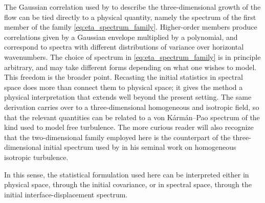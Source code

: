 The Gaussian correlation used by \citet{frame-towne-2024} to describe the three-dimensional growth of the flow can be tied directly to a physical quantity, namely the spectrum of the first member of the family \eqref{eq:eta_spectrum_family}. Higher-order members produce correlations given by a Gaussian envelope multiplied by a polynomial, and correspond to spectra with different distributions of variance over horizontal wavenumbers. The choice of spectrum in \eqref{eq:eta_spectrum_family} is in principle arbitrary, and may take different forms depending on what one wishes to model. This freedom is the broader point. Recasting the initial statistics in spectral space does more than connect them to physical space; it gives the method a physical interpretation that extends well beyond the present setting. The same derivation carries over to a three-dimensional homogeneous and isotropic field, so that the relevant quantities can be related to a von K\'arm\'an--Pao spectrum of the kind used to model free turbulence. The more curious reader will also recognize that the two-dimensional family employed here is the counterpart of the three-dimensional initial spectrum used by \citet{rogallo-1981} in his seminal work on homogeneous isotropic turbulence.

In this sense, the statistical formulation used here can be interpreted either in physical space, through the initial covariance, or in spectral space, through the initial interface-displacement spectrum. 



